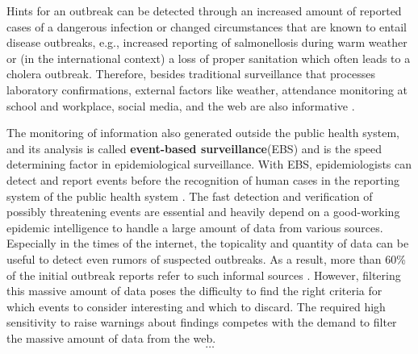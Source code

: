   Hints for an outbreak can be detected through an increased amount of reported cases of a dangerous infection or changed circumstances that are known to entail disease outbreaks, e.g., increased reporting of salmonellosis during warm weather or (in the international context) a loss of proper sanitation which often leads to a cholera outbreak.
  Therefore, besides traditional surveillance that processes laboratory confirmations, external factors like weather, attendance monitoring at school and workplace, social media, and the web are also informative \citep{EarlyDetection}.

  The monitoring of information also generated outside the public health system, and its analysis is called \textbf{event-based surveillance}(\gls{EBS}) and is the speed determining factor in epidemiological surveillance.
  With EBS, epidemiologists can detect and report events before the recognition of human cases in the reporting system of the public health system \citep{EarlyDetection}.
  The fast detection and verification of possibly threatening events are essential and heavily depend on a good-working epidemic intelligence to handle a large amount of data from various sources.
  Especially in the times of the internet, the topicality and quantity of data can be useful to detect even rumors of suspected outbreaks.
  As a result, more than 60\% of the initial outbreak reports refer to such informal sources \citep{EpiSurv}.
  However, filtering this massive amount of data poses the difficulty to find the right criteria for which events to consider interesting and which to discard.
  The required high sensitivity to raise warnings about findings competes with the demand to filter the massive amount of data from the web.
  \[\dots\]


